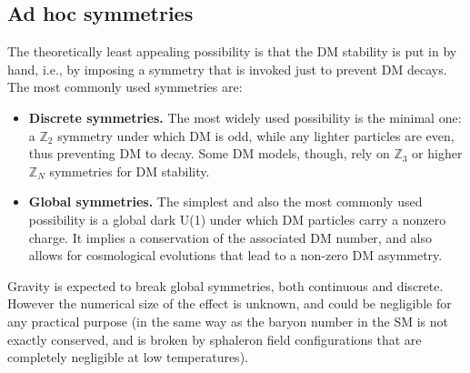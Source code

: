 \subsection{Ad hoc symmetries}\label{sec:adhoc:stabiilty}
The theoretically least appealing possibility is that the DM stability is put in by hand, i.e., by imposing a symmetry that is invoked just to prevent DM decays. The most commonly used symmetries are:
\begin{itemize}
\item[$\blacktriangleright$] {\bf Discrete symmetries.}
The most widely used possibility is the minimal one: a $\mathbb{Z}_2$ symmetry under which DM is odd, while any lighter particles are even, thus preventing DM to decay.
Some DM models, though, rely on $\mathbb{Z}_3$ or higher $\mathbb{Z}_N$ symmetries for DM stability. 
\item[$\blacktriangleright$]
{\bf Global symmetries. }The simplest and also the most commonly used possibility is a global dark U(1) under which DM particles carry a nonzero charge.
It implies a conservation of the associated DM number, and also allows for cosmological evolutions that lead to a non-zero DM asymmetry.
\end{itemize}
Gravity is expected to break global symmetries, both continuous and discrete.
However the numerical size of the effect is unknown, and could be negligible for any practical purpose
(in the same way as the baryon number in the SM is not exactly conserved, 
and is broken by sphaleron field configurations that are completely negligible at low temperatures).




